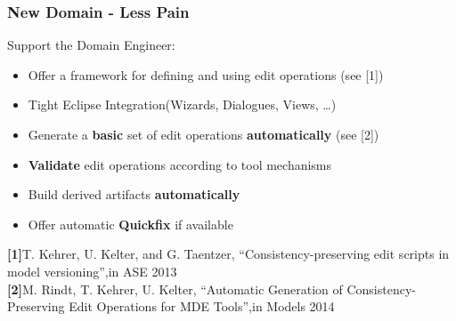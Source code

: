\begin{frame}
\frametitle{New Domain - Less Pain}
Support the Domain Engineer:
\begin{itemize}
  \item Offer a framework for defining and using edit operations (see [1])
\item Tight Eclipse Integration(Wizards, Dialogues, Views, \ldots)
\item Generate a \textbf{basic} set of edit operations \textbf{automatically} (see [2])
\item \textbf{Validate} edit operations according to tool mechanisms
\item Build derived artifacts \textbf{automatically}
\item Offer automatic \textbf{Quickfix} if available
\end{itemize}
\bigskip
{\footnotesize{
\textbf{[1]}T. Kehrer, U. Kelter, and G. Taentzer, ``Consistency-preserving edit scripts in model
versioning'',in ASE 2013\\
\medskip
\textbf{[2]}M. Rindt, T. Kehrer, U. Kelter, ``Automatic Generation of Consistency-Preserving Edit
Operations for MDE Tools'',in Models 2014}}
\end{frame}